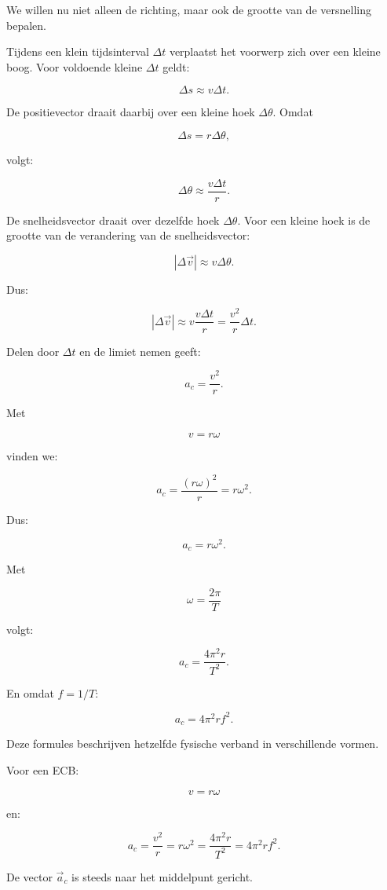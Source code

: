 \documentclass{ximera}
\begin{document}


We willen nu niet alleen de richting, maar ook de grootte van de
versnelling bepalen.

Tijdens een klein tijdsinterval $\Delta t$ verplaatst het voorwerp zich
over een kleine boog. Voor voldoende kleine $\Delta t$ geldt:

\[
\Delta s\approx v\Delta t.
\]

De positievector draait daarbij over een kleine hoek $\Delta\theta$.
Omdat

\[
\Delta s=r\Delta\theta,
\]

volgt:

\[
\Delta\theta
\approx
\frac{v\Delta t}{r}.
\]

De snelheidsvector draait over dezelfde hoek $\Delta\theta$. Voor een
kleine hoek is de grootte van de verandering van de snelheidsvector:

\[
|\Delta\vec v|
\approx
v\Delta\theta.
\]

Dus:

\[
|\Delta\vec v|
\approx
v\frac{v\Delta t}{r}
=
\frac{v^2}{r}\Delta t.
\]

Delen door $\Delta t$ en de limiet nemen geeft:

\[
\boxed{
a_c=\frac{v^2}{r}.
}
\]



Met

\[
v=r\omega
\]

vinden we:

\[
a_c
=
\frac{(r\omega)^2}{r}
=
r\omega^2.
\]

Dus:

\[
\boxed{
a_c=r\omega^2.
}
\]

Met

\[
\omega=\frac{2\pi}{T}
\]

volgt:

\[
\boxed{
a_c=\frac{4\pi^2r}{T^2}.
}
\]

En omdat $f=1/T$:

\[
\boxed{
a_c=4\pi^2rf^2.
}
\]

Deze formules beschrijven hetzelfde fysische verband in verschillende
vormen.


\begin{eigenschap}

Voor een ECB:

\[
\boxed{
v=r\omega
}
\]

en:

\[
\boxed{
a_c=\frac{v^2}{r}=r\omega^2
=\frac{4\pi^2r}{T^2}=4\pi^2rf^2.
}
\]

De vector $\vec a_c$ is steeds naar het middelpunt gericht.

\end{eigenschap}
\end{document}
